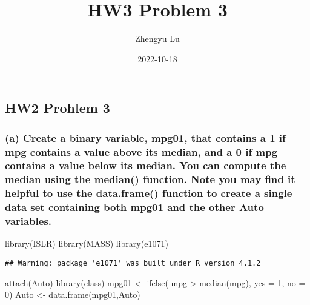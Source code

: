 \documentclass[
]{article}
\title{HW3 Problem 3}
\author{Zhengyu Lu}
\date{2022-10-18}
\newenvironment{Shaded}{\begin{snugshade}}{\end{snugshade}}
\newcommand{\AttributeTok}[1]{\textcolor[rgb]{0.77,0.63,0.00}{#1}}
\newcommand{\DecValTok}[1]{\textcolor[rgb]{0.00,0.00,0.81}{#1}}
\newcommand{\FunctionTok}[1]{\textcolor[rgb]{0.00,0.00,0.00}{#1}}
\newcommand{\NormalTok}[1]{#1}
\newcommand{\OtherTok}[1]{\textcolor[rgb]{0.56,0.35,0.01}{#1}}
\newcommand{\SpecialCharTok}[1]{\textcolor[rgb]{0.00,0.00,0.00}{#1}}
\begin{document}
\maketitle

\hypertarget{hw2-prohlem-3}{%
\subsection{HW2 Prohlem 3}\label{hw2-prohlem-3}}

\hypertarget{a-create-a-binary-variable-mpg01-that-contains-a-1-if-mpg-contains-a-value-above-its-median-and-a-0-if-mpg-contains-a-value-below-its-median.-you-can-compute-the-median-using-the-median-function.-note-you-may-find-it-helpful-to-use-the-data.frame-function-to-create-a-single-data-set-containing-both-mpg01-and-the-other-auto-variables.}{%
\subsubsection{(a) Create a binary variable, mpg01, that contains a 1 if
mpg contains a value above its median, and a 0 if mpg contains a value
below its median. You can compute the median using the median()
function. Note you may find it helpful to use the data.frame() function
to create a single data set containing both mpg01 and the other Auto
variables.}\label{a-create-a-binary-variable-mpg01-that-contains-a-1-if-mpg-contains-a-value-above-its-median-and-a-0-if-mpg-contains-a-value-below-its-median.-you-can-compute-the-median-using-the-median-function.-note-you-may-find-it-helpful-to-use-the-data.frame-function-to-create-a-single-data-set-containing-both-mpg01-and-the-other-auto-variables.}}

\begin{Shaded}
\begin{Highlighting}[]
\FunctionTok{library}\NormalTok{(ISLR)}
\FunctionTok{library}\NormalTok{(MASS)}
\FunctionTok{library}\NormalTok{(e1071)}
\end{Highlighting}
\end{Shaded}

\begin{verbatim}
## Warning: package 'e1071' was built under R version 4.1.2
\end{verbatim}

\begin{Shaded}
\begin{Highlighting}[]
\FunctionTok{attach}\NormalTok{(Auto)}
\FunctionTok{library}\NormalTok{(class)}
\NormalTok{mpg01 }\OtherTok{\textless{}{-}} \FunctionTok{ifelse}\NormalTok{( mpg }\SpecialCharTok{\textgreater{}} \FunctionTok{median}\NormalTok{(mpg), }\AttributeTok{yes =} \DecValTok{1}\NormalTok{, }\AttributeTok{no =} \DecValTok{0}\NormalTok{)}
\NormalTok{Auto }\OtherTok{\textless{}{-}} \FunctionTok{data.frame}\NormalTok{(mpg01,Auto)}
\end{Highlighting}
\end{Shaded}
\end{document}
